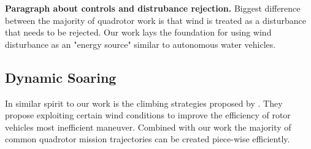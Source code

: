 \textbf{Paragraph about controls and distrubance rejection.} Biggest difference between the majority of quadrotor work is that wind is treated as a disturbance that needs to be rejected\cite{waslander2009wind}. Our work lays the foundation for using wind disturbance as an "energy source" similar to autonomous water vehicles.

\subsection{Dynamic Soaring}
In similar spirit to our work is the climbing strategies proposed by \cite{zhao2017optimal}. They propose exploiting certain wind conditions to improve the efficiency of rotor vehicles most inefficient maneuver. Combined with our work the majority of common quadrotor mission trajectories can be created piece-wise efficiently.


